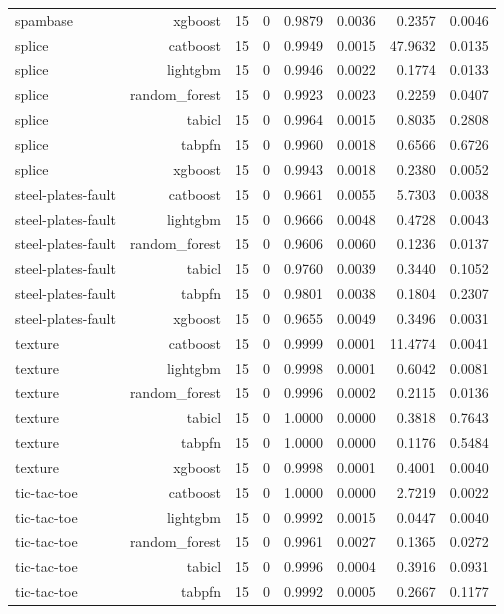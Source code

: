 \begin{table}[htbp]
\begin{tabular}{lrrrrrrr}
spambase & xgboost & 15 & 0 & 0.9879 & 0.0036 & 0.2357 & 0.0046 \\
splice & catboost & 15 & 0 & 0.9949 & 0.0015 & 47.9632 & 0.0135 \\
splice & lightgbm & 15 & 0 & 0.9946 & 0.0022 & 0.1774 & 0.0133 \\
splice & random\_forest & 15 & 0 & 0.9923 & 0.0023 & 0.2259 & 0.0407 \\
splice & tabicl & 15 & 0 & 0.9964 & 0.0015 & 0.8035 & 0.2808 \\
splice & tabpfn & 15 & 0 & 0.9960 & 0.0018 & 0.6566 & 0.6726 \\
splice & xgboost & 15 & 0 & 0.9943 & 0.0018 & 0.2380 & 0.0052 \\
steel-plates-fault & catboost & 15 & 0 & 0.9661 & 0.0055 & 5.7303 & 0.0038 \\
steel-plates-fault & lightgbm & 15 & 0 & 0.9666 & 0.0048 & 0.4728 & 0.0043 \\
steel-plates-fault & random\_forest & 15 & 0 & 0.9606 & 0.0060 & 0.1236 & 0.0137 \\
steel-plates-fault & tabicl & 15 & 0 & 0.9760 & 0.0039 & 0.3440 & 0.1052 \\
steel-plates-fault & tabpfn & 15 & 0 & 0.9801 & 0.0038 & 0.1804 & 0.2307 \\
steel-plates-fault & xgboost & 15 & 0 & 0.9655 & 0.0049 & 0.3496 & 0.0031 \\
texture & catboost & 15 & 0 & 0.9999 & 0.0001 & 11.4774 & 0.0041 \\
texture & lightgbm & 15 & 0 & 0.9998 & 0.0001 & 0.6042 & 0.0081 \\
texture & random\_forest & 15 & 0 & 0.9996 & 0.0002 & 0.2115 & 0.0136 \\
texture & tabicl & 15 & 0 & 1.0000 & 0.0000 & 0.3818 & 0.7643 \\
texture & tabpfn & 15 & 0 & 1.0000 & 0.0000 & 0.1176 & 0.5484 \\
texture & xgboost & 15 & 0 & 0.9998 & 0.0001 & 0.4001 & 0.0040 \\
tic-tac-toe & catboost & 15 & 0 & 1.0000 & 0.0000 & 2.7219 & 0.0022 \\
tic-tac-toe & lightgbm & 15 & 0 & 0.9992 & 0.0015 & 0.0447 & 0.0040 \\
tic-tac-toe & random\_forest & 15 & 0 & 0.9961 & 0.0027 & 0.1365 & 0.0272 \\
tic-tac-toe & tabicl & 15 & 0 & 0.9996 & 0.0004 & 0.3916 & 0.0931 \\
tic-tac-toe & tabpfn & 15 & 0 & 0.9992 & 0.0005 & 0.2667 & 0.1177 \\

\end{tabular}
\end{table}
